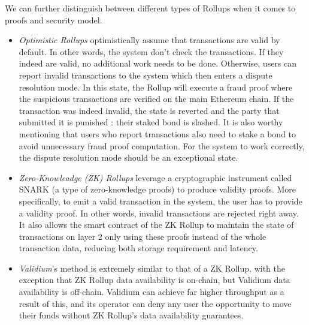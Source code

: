 We can further distinguish between different types of Rollups when it comes to proofs and security model. 
\begin{itemize}
    \item \textit{Optimistic Rollups} optimistically assume that transactions are valid by default. In other words, the system don't check the transactions. If they indeed are valid, no additional work needs to be done. Otherwise, users can report invalid transactions to the system which then enters a dispute resolution mode. In this state, the Rollup will execute a fraud proof where the suspicious transactions are verified on the main Ethereum chain. If the transaction was indeed invalid, the state is reverted and the party that submitted it is punished : their staked bond is slashed. It is also worthy mentioning that users who report transactions also need to stake a bond to avoid unnecessary fraud proof computation. For the system to work correctly, the dispute resolution mode should be an exceptional state. 
    
    \item \textit{Zero-Knowleadge (ZK) Rollups} leverage a cryptographic instrument called SNARK (a type of zero-knowledge proofs) to produce validity proofs. More specifically, to emit a valid transaction in the system, the user has to provide a validity proof. In other words, invalid transactions are rejected right away. It also allows the smart contract of the ZK Rollup to maintain the state of transactions on layer 2 only using these proofs instead of the whole transaction data, reducing both storage requirement and latency. 
    \item \textit{Validium}'s method is extremely similar to that of a ZK Rollup, with the exception that ZK Rollup data availability is on-chain, but Validium data availability is off-chain. Validium can achieve far higher throughput as a result of this, and its operator can deny any user the opportunity to move their funds without ZK Rollup's data availability guarantees.
\end{itemize}



